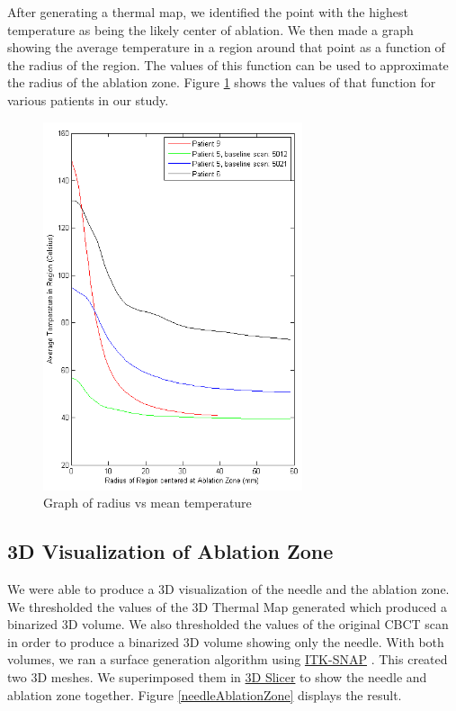 \documentclass[]{spie}  %
\begin{document}
After generating a thermal map, we identified the point with the highest temperature as being the likely center of ablation. We then made a graph showing the average temperature in a region around that point as a function of the radius of the region. The values of this function can be used to approximate the radius of the ablation zone. Figure \ref{graphRadMean} shows the values of that function for various patients in our study. 

\begin{figure} 
\centering 
\includegraphics[width=3in]{meanTempVsRadiusFull.png} 
\caption{Graph of radius vs mean temperature} 
\label{graphRadMean}
\end{figure}


\subsection{3D Visualization of Ablation Zone}

We were able to produce a 3D visualization of the needle and the ablation zone. We thresholded the values of the 3D Thermal Map generated which produced a binarized 3D volume. We also thresholded the values of the original CBCT scan in order to produce a binarized 3D volume showing only the needle. With both volumes, we ran a surface generation algorithm using \href{www.itksnap.org}{ITK-SNAP} \cite{Yushkevich06}. This created two 3D meshes. We superimposed them in \href{http://www.slicer.org/}{3D Slicer} \cite{Fedorov12} to show the needle and ablation zone together. Figure \ref{needleAblationZone} displays the result.
\end{document}
